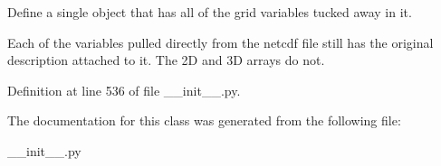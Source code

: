 Define a single object that has all of the grid variables tucked away in it. 

Each of the variables pulled directly from the netcdf file still has the original description attached to it. The 2\+D and 3\+D arrays do not. 

Definition at line 536 of file \+\_\+\+\_\+init\+\_\+\+\_\+.\+py.



The documentation for this class was generated from the following file\+:\begin{DoxyCompactItemize}
\item 
\+\_\+\+\_\+init\+\_\+\+\_\+.\+py\end{DoxyCompactItemize}
